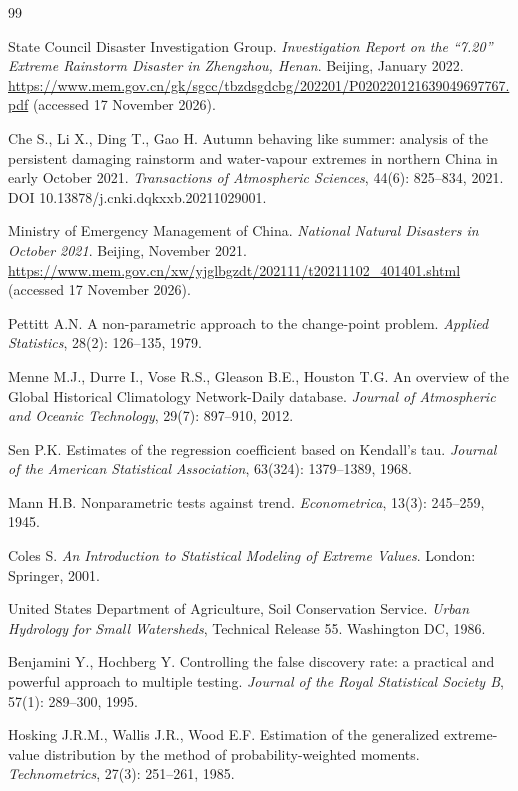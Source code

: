 \begin{thebibliography}{99}

 State Council Disaster Investigation Group. \emph{Investigation Report on the ``7.20'' Extreme Rainstorm Disaster in Zhengzhou, Henan}. Beijing, January 2022. \url{https://www.mem.gov.cn/gk/sgcc/tbzdsgdcbg/202201/P020220121639049697767.pdf} (accessed 17 November 2026).

 Che S., Li X., Ding T., Gao H. Autumn behaving like summer: analysis of the persistent damaging rainstorm and water-vapour extremes in northern China in early October 2021. \emph{Transactions of Atmospheric Sciences}, 44(6): 825--834, 2021. DOI 10.13878/j.cnki.dqkxxb.20211029001.

 Ministry of Emergency Management of China. \emph{National Natural Disasters in October 2021}. Beijing, November 2021. \url{https://www.mem.gov.cn/xw/yjglbgzdt/202111/t20211102_401401.shtml} (accessed 17 November 2026).

 Pettitt A.N. A non-parametric approach to the change-point problem. \emph{Applied Statistics}, 28(2): 126--135, 1979.

 Menne M.J., Durre I., Vose R.S., Gleason B.E., Houston T.G. An overview of the Global Historical Climatology Network-Daily database. \emph{Journal of Atmospheric and Oceanic Technology}, 29(7): 897--910, 2012.

 Sen P.K. Estimates of the regression coefficient based on Kendall's tau. \emph{Journal of the American Statistical Association}, 63(324): 1379--1389, 1968.

 Mann H.B. Nonparametric tests against trend. \emph{Econometrica}, 13(3): 245--259, 1945.

 Coles S. \emph{An Introduction to Statistical Modeling of Extreme Values}. London: Springer, 2001.

 United States Department of Agriculture, Soil Conservation Service. \emph{Urban Hydrology for Small Watersheds}, Technical Release 55. Washington DC, 1986.

 Benjamini Y., Hochberg Y. Controlling the false discovery rate: a practical and powerful approach to multiple testing. \emph{Journal of the Royal Statistical Society B}, 57(1): 289--300, 1995.

 Hosking J.R.M., Wallis J.R., Wood E.F. Estimation of the generalized extreme-value distribution by the method of probability-weighted moments. \emph{Technometrics}, 27(3): 251--261, 1985.


\end{thebibliography}
